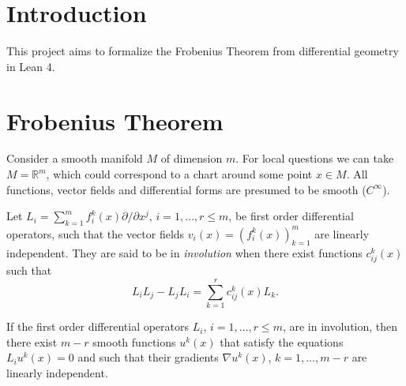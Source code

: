 %

\chapter{Introduction}

This project aims to formalize the Frobenius Theorem from differential geometry in Lean 4.

\chapter{Frobenius Theorem}

Consider a smooth manifold $M$ of dimension $m$. For local questions we can take
$M=\mathbb{R}^m$, which could correspond to a chart around some point $x\in M$.
All functions, vector fields and differential forms are presumed to be smooth ($C^\infty$).

\begin{definition}[involutivity] \label{def:invol}
Let $L_i = \sum_{k=1}^m f_i^k(x) \partial/\partial x^j$, $i=1,\ldots,r\le m$, be
first order differential operators, such that the vector fields $v_i(x) =
(f_i^k(x))_{k=1}^m$ are linearly independent. They are said to be in
\emph{involution} when there exist functions $c^k_{ij}(x)$ such that
\[
  L_i L_j - L_j L_i = \sum_{k=1}^r c^k_{ij}(x) L_k .
\]
\end{definition}

\begin{theorem} \label{thm:frob-loc}
If the first order differential operators $L_i$, $i=1,\ldots,r \le m$, are in
involution, then there exist $m-r$ smooth functions $u^k(x)$ that satisfy the
equations $L_i u^k(x) = 0$ and such that their gradients $\nabla u^k(x)$,
$k=1,\ldots,m-r$ are linearly independent.
\end{theorem}

